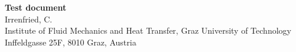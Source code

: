 \documentclass[a4paper, 11pt]{article}
\begin{document}
\noindent
{\Large \textbf{Test document} }\\
Irrenfried, C. \\
{\small Institute of Fluid Mechanics and Heat Transfer, Graz University of Technology} \\
{\small Inffeldgasse 25F, 8010 Graz, Austria}

\textcite{irrenfried2020convective}





\clearpage

{\small

 \printbibliography
  \label{chap:bibliography}
}
\end{document}
